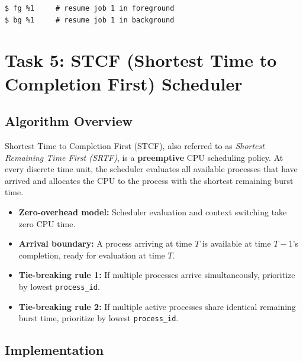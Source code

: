 \documentclass[11pt,a4paper]{article}
\begin{document}
\begin{lstlisting}[style=bashstyle]
$ fg %1     # resume job 1 in foreground
$ bg %1     # resume job 1 in background
\end{lstlisting}

\newpage

\section{Task 5: STCF (Shortest Time to Completion First) Scheduler}

\subsection{Algorithm Overview}

Shortest Time to Completion First (STCF), also referred to as \emph{Shortest Remaining Time First (SRTF)}, is a \textbf{preemptive} CPU scheduling policy. At every discrete time unit, the scheduler evaluates all available processes that have arrived and allocates the CPU to the process with the shortest remaining burst time.

\begin{itemize}[leftmargin=1.5em]
    \item \textbf{Zero-overhead model:} Scheduler evaluation and context switching take zero CPU time.
    \item \textbf{Arrival boundary:} A process arriving at time $T$ is available at time $T-1$'s completion, ready for evaluation at time $T$.
    \item \textbf{Tie-breaking rule 1:} If multiple processes arrive simultaneously, prioritize by lowest \texttt{process\_id}.
    \item \textbf{Tie-breaking rule 2:} If multiple active processes share identical remaining burst time, prioritize by lowest \texttt{process\_id}.
\end{itemize}

\subsection{Implementation}
\end{document}
